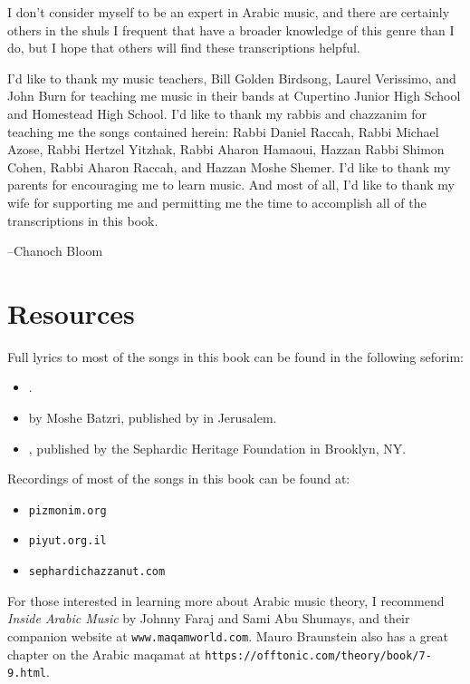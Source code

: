 \documentclass[letterpaper]{memoir}
\begin{document}
I don't consider myself to be an expert in Arabic music, and there are 
certainly others in the shuls I frequent that have a broader knowledge of this 
genre than I do, but I hope that others will find these transcriptions helpful.

I'd like to thank my music teachers, Bill Golden Birdsong, Laurel 
Verissimo, and John Burn for teaching me music in their bands at 
Cupertino Junior High School and Homestead High School.
I'd like to thank my rabbis and 
chazzanim for teaching me the songs contained herein: Rabbi Daniel Raccah, Rabbi 
Michael Azose, Rabbi Hertzel Yitzhak, Rabbi Aharon Hamaoui, Hazzan Rabbi Shimon 
Cohen, Rabbi Aharon Raccah, and Hazzan Moshe Shemer. I'd like to thank my 
parents for encouraging me to learn music. And most of all, I'd like to thank my 
wife for supporting me and permitting me the time to accomplish all of the 
transcriptions in this book.

--Chanoch Bloom

\section*{Resources}

Full lyrics to most of the songs in this book can be found in the following seforim:

\begin{itemize}
\item {}.
\item {} by Moshe Batzri, published by  in Jerusalem.
\item {}, published by the Sephardic Heritage Foundation in Brooklyn, NY.
\end{itemize}

\noindent
Recordings of most of the songs in this book can be found at:

\begin{itemize}
\item \texttt{pizmonim.org}
\item \texttt{piyut.org.il}
\item \texttt{sephardichazzanut.com}
\end{itemize}

For those interested in learning more about
Arabic music theory, I recommend \textit{Inside Arabic Music} by Johnny 
Faraj and Sami Abu Shumays, and their companion website at \texttt{www.maqamworld.com}.
Mauro Braunstein also has a great chapter on the Arabic maqamat at 
\texttt{https://offtonic.com/theory/book/7-9.html}.
\end{document}
